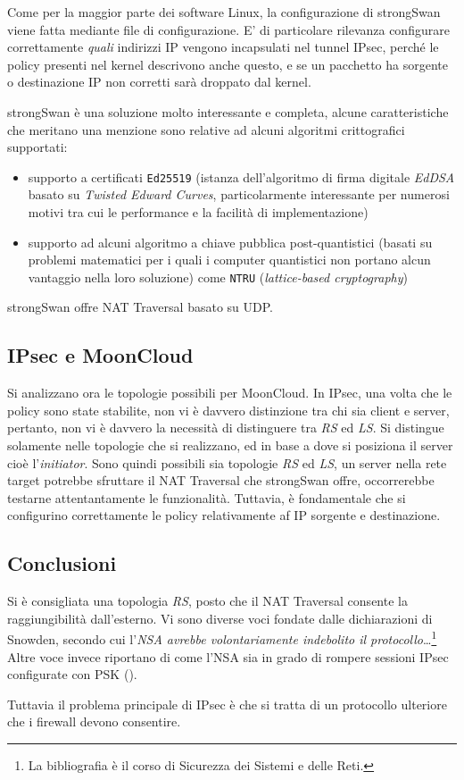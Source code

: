 Come per la maggior parte dei software Linux, la configurazione di strongSwan viene
fatta mediante file di configurazione.
E' di particolare rilevanza configurare correttamente \textit{quali} indirizzi IP vengono
incapsulati nel tunnel IPsec, perché le policy presenti nel kernel descrivono anche questo,
e se un pacchetto ha sorgente o destinazione IP non corretti sarà droppato dal kernel.

strongSwan è una soluzione molto interessante e completa, alcune caratteristiche
che meritano una menzione sono relative ad alcuni algoritmi crittografici supportati:
\begin{itemize}
  \item supporto a certificati \texttt{Ed25519} (istanza dell'algoritmo di firma digitale
  \textit{EdDSA} basato su \textit{Twisted Edward Curves},
  particolarmente interessante per numerosi motivi tra cui le
  performance e la facilità di implementazione)
  \item supporto ad alcuni algoritmo a chiave pubblica post-quantistici (basati su
  problemi matematici per i quali i computer quantistici non portano alcun vantaggio
  nella loro soluzione) come \texttt{NTRU} (\textit{lattice-based cryptography})
\end{itemize}
strongSwan offre NAT Traversal basato su UDP.


\subsection{IPsec e MoonCloud}
Si analizzano ora le topologie possibili per MoonCloud. In IPsec, una volta
che le policy sono state stabilite, non vi è davvero distinzione tra chi sia client e server, pertanto,
non vi è davvero la necessità di distinguere tra \textit{RS} ed \textit{LS}.
Si distingue solamente nelle topologie che si realizzano, ed in base a dove si posiziona il server cioè
l'\textit{initiator}.
Sono quindi possibili sia topologie \textit{RS} ed \textit{LS}, un server nella rete target
potrebbe sfruttare il NAT Traversal che strongSwan offre, occorrerebbe testarne attentantamente
le funzionalità. Tuttavia, è fondamentale che si configurino correttamente le policy
relativamente af IP sorgente e destinazione.


\subsection{Conclusioni}
Si è consigliata una topologia \textit{RS}, posto che il NAT Traversal consente
la raggiungibilità dall'esterno.
Vi sono diverse voci fondate dalle dichiarazioni di Snowden, secondo cui l'\textit{NSA avrebbe volontariamente
indebolito il protocollo}\ldots\footnote{La bibliografia è il corso di Sicurezza dei Sistemi
e delle Reti.}
Altre voce invece riportano di come l'NSA sia in grado di rompere sessioni IPsec
configurate con PSK (\cite{ipsec-nsa}).

Tuttavia il problema principale di IPsec è che si tratta di un protocollo ulteriore che
i firewall devono consentire.
